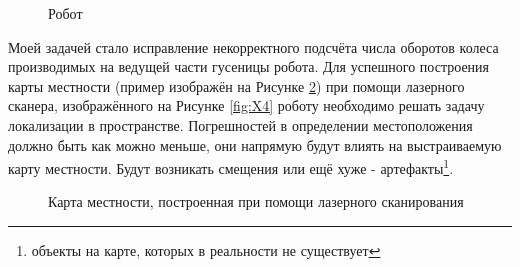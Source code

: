 \documentclass[12pt,a4paper]{scrartcl}
\begin{document}
			\begin{figure}[h]
				\caption{Робот}
				\label{fig:Robot}
			\end{figure}
			
			Моей задачей стало исправление некорректного подсчёта числа оборотов колеса производимых на ведущей части гусеницы робота. Для успешного построения карты местности (пример изображён на Рисунке \ref{fig:Map}) при помощи лазерного сканера, изображённого на Рисунке \ref{fig:X4} роботу необходимо решать задачу локализации в пространстве. Погрешностей в определении местоположения должно быть как можно меньше, они напрямую будут влиять на выстраиваемую карту местности. Будут возникать смещения или ещё хуже - артефакты\footnote{объекты на карте, которых в реальности не существует}.
			
			\begin{figure}[h]
				\caption{Карта местности, построенная при помощи лазерного сканирования}
				\label{fig:Map}
			\end{figure}
			
\end{document}
